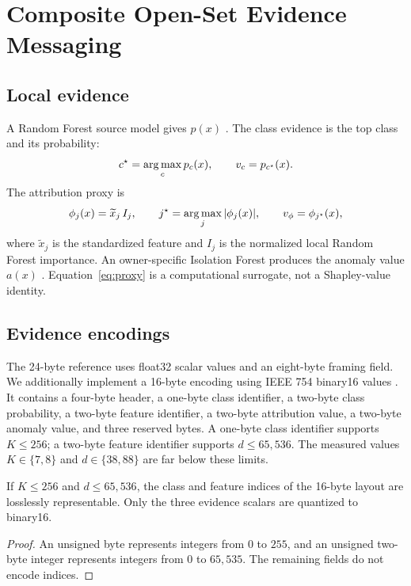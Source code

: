 \section{Composite Open-Set Evidence Messaging}

\subsection{Local evidence}

A Random Forest source model gives $p(x)$ \cite{breiman2001rf}. The class evidence is the top class and its probability:
\begin{equation}
c^\star=\operatorname*{arg\,max}_c p_c(x),\qquad v_c=p_{c^\star}(x).
\end{equation}
The attribution proxy is
\begin{equation}
\phi_j(x)=\widetilde{x}_j\,I_j,\qquad
j^\star=\operatorname*{arg\,max}_j|\phi_j(x)|,\qquad v_\phi=\phi_{j^\star}(x),
\label{eq:proxy}
\end{equation}
where $\widetilde{x}_j$ is the standardized feature and $I_j$ is the normalized local Random Forest importance. An owner-specific Isolation Forest produces the anomaly value $a(x)$ \cite{liu2008iforest}. Equation~\eqref{eq:proxy} is a computational surrogate, not a Shapley-value identity.

\subsection{Evidence encodings}

The 24-byte reference uses float32 scalar values and an eight-byte framing field. We additionally implement a 16-byte encoding using IEEE 754 binary16 values \cite{ieee754}. It contains a four-byte header, a one-byte class identifier, a two-byte class probability, a two-byte feature identifier, a two-byte attribution value, a two-byte anomaly value, and three reserved bytes. A one-byte class identifier supports $K\leq256$; a two-byte feature identifier supports $d\leq65{,}536$. The measured values $K\in\{7,8\}$ and $d\in\{38,88\}$ are far below these limits.

\begin{proposition}
If $K\leq256$ and $d\leq65{,}536$, the class and feature indices of the 16-byte layout are losslessly representable. Only the three evidence scalars are quantized to binary16.
\end{proposition}
\begin{proof}
An unsigned byte represents integers from $0$ to $255$, and an unsigned two-byte integer represents integers from $0$ to $65{,}535$. The remaining fields do not encode indices.
\end{proof}

